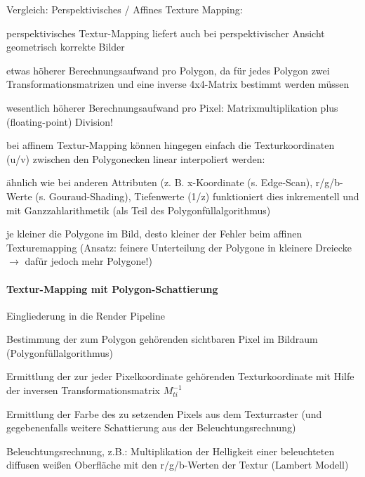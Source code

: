 \documentclass[landscape]{article}
\begin{document}
\begin{multicols}{3}
  Vergleich: Perspektivisches / Affines Texture Mapping:
  \begin{itemize*}
    \item perspektivisches Textur-Mapping liefert auch bei perspektivischer Ansicht geometrisch korrekte Bilder
    \item etwas höherer Berechnungsaufwand pro Polygon, da für jedes Polygon zwei Transformationsmatrizen und eine inverse 4x4-Matrix bestimmt werden müssen
    \item wesentlich höherer Berechnungsaufwand pro Pixel: Matrixmultiplikation plus (floating-point) Division!
    \item bei affinem Textur-Mapping können hingegen einfach die Texturkoordinaten (u/v) zwischen den Polygonecken linear interpoliert werden:
    \item ähnlich wie bei anderen Attributen (z. B. x-Koordinate (s. Edge-Scan), r/g/b-Werte (s. Gouraud-Shading), Tiefenwerte (1/z) funktioniert dies inkrementell und mit Ganzzahlarithmetik (als Teil des Polygonfüllalgorithmus)
    \item je kleiner die Polygone im Bild, desto kleiner der Fehler beim affinen Texturemapping (Ansatz: feinere Unterteilung der Polygone in kleinere Dreiecke $\rightarrow$ dafür jedoch mehr Polygone!)
  \end{itemize*}
  
  \paragraph{Textur-Mapping mit Polygon-Schattierung}
  Eingliederung in die Render Pipeline
  \begin{itemize*}
    \item Bestimmung der zum Polygon gehörenden sichtbaren Pixel im Bildraum (Polygonfüllalgorithmus)
    \item Ermittlung der zur jeder Pixelkoordinate gehörenden Texturkoordinate mit Hilfe der inversen Transformationsmatrix $M_{ti}^{-1}$
    \item Ermittlung der Farbe des zu setzenden Pixels aus dem Texturraster (und gegebenenfalls weitere Schattierung aus der Beleuchtungsrechnung)
    \item Beleuchtungsrechnung, z.B.: Multiplikation der Helligkeit einer beleuchteten diffusen weißen Oberfläche mit den r/g/b-Werten der Textur (Lambert Modell)
  \end{itemize*}
  

\end{multicols}
\end{document}

